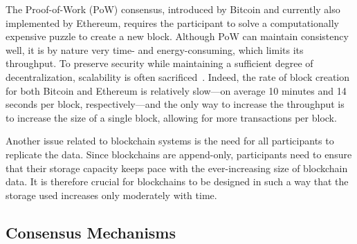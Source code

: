 The Proof-of-Work (PoW) consensus,
introduced by Bitcoin and currently also implemented by Ethereum, requires the participant to solve a computationally expensive puzzle to create a new block. Although PoW can maintain consistency well, it is by nature very time- and energy-consuming, which limits its throughput.
To preserve security while maintaining a sufficient degree of decentralization, scalability is often sacrificed~\cite{Xie2019}.
Indeed, the rate of block creation for both Bitcoin and Ethereum is relatively slow---on average 10 minutes and 14 seconds per block, respectively---and the only way to increase the throughput is to increase the size of a single block, allowing for more transactions per block.

Another issue related to blockchain systems is the need for all participants to replicate the data.
Since blockchains are append-only, participants need to ensure that their storage capacity keeps pace with the ever-increasing size of blockchain data. 
It is therefore crucial for blockchains to be designed in such a way that the storage used increases only moderately with time.


\subsection{Consensus Mechanisms}

